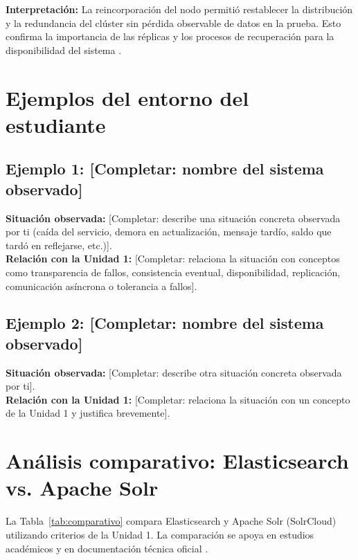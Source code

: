 \documentclass[12pt,a4paper]{article}
\begin{document}
\noindent\textbf{Interpretación:} La reincorporación del nodo permitió restablecer la distribución y la redundancia del clúster sin pérdida observable de datos en la prueba. Esto confirma la importancia de las réplicas y los procesos de recuperación para la disponibilidad del sistema \cite{elastic_nodes_shards,elastic_resilience}.

\section{Ejemplos del entorno del estudiante}

\subsection{Ejemplo 1: [Completar: nombre del sistema observado]}
\textbf{Situación observada:} [Completar: describe una situación concreta observada por ti (caída del servicio, demora en actualización, mensaje tardío, saldo que tardó en reflejarse, etc.)].\\
\textbf{Relación con la Unidad 1:} [Completar: relaciona la situación con conceptos como transparencia de fallos, consistencia eventual, disponibilidad, replicación, comunicación asíncrona o tolerancia a fallos].

\subsection{Ejemplo 2: [Completar: nombre del sistema observado]}
\textbf{Situación observada:} [Completar: describe otra situación concreta observada por ti].\\
\textbf{Relación con la Unidad 1:} [Completar: relaciona la situación con un concepto de la Unidad 1 y justifica brevemente].

\section{Análisis comparativo: Elasticsearch vs. Apache Solr}

La Tabla~\ref{tab:comparativo} compara Elasticsearch y Apache Solr (SolrCloud) utilizando criterios de la Unidad 1. La comparación se apoya en estudios académicos \cite{deniz-2023,feraru-2026,unger-2023,lu-2026,cheresharov-2026,calderon-2023} y en documentación técnica oficial \cite{elastic_distributed_architecture,elastic_nodes_shards,elastic_read_write,elastic_discovery,elastic_resilience,solr_shards_indexing,solr_distributed_requests,solr_recoveries}.
\end{document}

